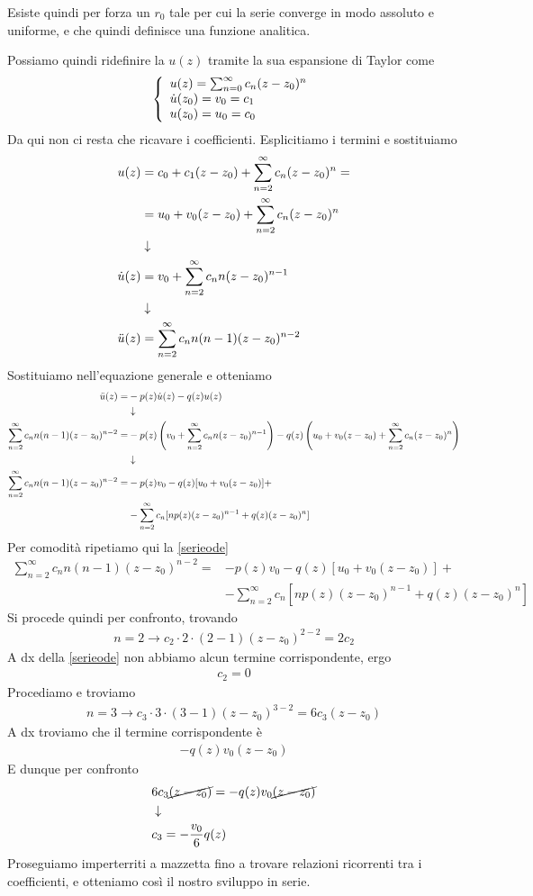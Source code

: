 Esiste quindi per forza un $r_0$ tale per cui la serie converge in modo assoluto e uniforme, e che quindi definisce una funzione analitica.

Possiamo quindi ridefinire la $u(z)$ tramite la sua espansione di Taylor come
\begin{align}
	\triple{u(z) = \sum_{n=0}^{\infty} c_n(z-z_0)^n}{\dot{u}(z_0) = v_0 = c_1 \hfill}{u(z_0) = u_0 = c_0 \hfill}
\end{align}
Da qui non ci resta che ricavare i coefficienti. Esplicitiamo i termini e sostituiamo
\begin{align}
       u(z) &= c_0 + c_1 (z-z_0) + \sum_{n=2}^{\infty} c_n(z-z_0)^n = \nonumber \\
            &= u_0 + v_0 (z-z_0) + \sum_{n=2}^{\infty} c_n(z-z_0)^n \\ &\downarrow \nonumber \\
 \dot{u}(z) &= v_0 + \sum_{n=2}^{\infty} c_n n(z-z_0)^{n-1} \\ &\downarrow \nonumber \\
\ddot{u}(z) &= \sum_{n=2}^{\infty} c_n n(n-1)(z-z_0)^{n-2}
\end{align}
Sostituiamo nell'equazione generale e otteniamo
\begin{align}
	\ddot{u}(z) =& - p(z) \dot{u}(z) - q(z) u(z) \\ &\downarrow \nonumber \\
	\sum_{n=2}^{\infty} c_n n(n-1)(z-z_0)^{n-2} =& -p(z) \left(v_0 + \sum_{n=2}^{\infty} c_n n(z-z_0)^{n-1}\right) - q(z) \left( u_0 + v_0 (z-z_0) + \sum_{n=2}^{\infty} c_n(z-z_0)^n \right) \nonumber \\ &\downarrow \nonumber \\
	\sum_{n=2}^{\infty} c_n n(n-1)(z-z_0)^{n-2} =& -p(z)v_0 - q(z)[u_0 + v_0 (z-z_0) ] + \nonumber\\ 
	&- \sum_{n=2}^{\infty} c_n [np(z)(z-z_0)^{n-1} + q(z)(z-z_0)^n] \label{serieode}
\end{align}
\newpage
Per comodità ripetiamo qui la \ref{serieode}
\begin{align}
	\sum_{n=2}^{\infty} c_n n(n-1)(z-z_0)^{n-2} =& -p(z)v_0 - q(z)[u_0 + v_0 (z-z_0) ] + \nonumber\\ 
	&- \sum_{n=2}^{\infty} c_n [np(z)(z-z_0)^{n-1} + q(z)(z-z_0)^n]
\end{align}
Si procede quindi per confronto, trovando
\begin{align}
	n = 2 \to c_2 \cdot 2 \cdot (2-1) (z-z_0)^{2-2} = 2c_2
\end{align}
A dx della \ref{serieode} non abbiamo alcun termine corrispondente, ergo
\begin{align}
	c_2 = 0
\end{align}
Procediamo e troviamo
\begin{align}
	n = 3 \to c_3 \cdot 3 \cdot (3-1) (z-z_0)^{3-2} = 6c_3 (z-z_0)
\end{align}
A dx troviamo che il termine corrispondente è
\begin{align}
	- q(z)v_0 (z-z_0)
\end{align}
E dunque per confronto
\begin{align}
	&6c_3 \cancel{(z-z_0)} = - q(z)v_0 \cancel{(z-z_0)}\\ &\downarrow \nonumber \\
	&c_3 = -\frac{v_0}{6}q(z) 
\end{align}
Proseguiamo imperterriti a mazzetta fino a trovare relazioni ricorrenti tra i coefficienti, e otteniamo così il  nostro sviluppo in serie.


